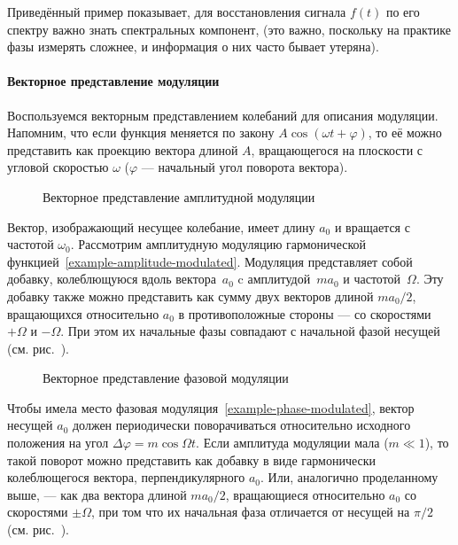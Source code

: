 Приведённый пример показывает, для восстановления сигнала $f(t)$ по его спектру важно
знать  спектральных компонент, 
(это важно, поскольку на практике фазы измерять сложнее, и информация о
них часто бывает утеряна).

\paragraph{Векторное представление модуляции}
Воспользуемся векторным представлением колебаний для описания модуляции.
Напомним, что если функция меняется по закону $A\cos (\omega t + \varphi)$,
то её можно представить как проекцию вектора
длиной $A$, вращающегося на плоскости с угловой скоростью $\omega$
($\varphi$ --- начальный угол поворота вектора).

\begin{figure}[h!]
    \centering
    \caption{Векторное представление амплитудной модуляции}
\end{figure}
Вектор, изображающий несущее колебание, имеет длину $a_0$
и вращается с частотой $\omega_0$.
Рассмотрим амплитудную модуляцию гармонической 
функцией~\eqref{example-amplitude-modulated}.
Модуляция представляет собой добавку, колеблющуюся вдоль 
вектора~$a_0$ c амплитудой~$ma_0$ и частотой~$\Omega$.
Эту добавку также можно представить как сумму двух векторов длиной
$ma_0/2$, вращающихся относительно $a_0$ в противоположные стороны ---
со скоростями $+\Omega$ и $-\Omega$. При этом их начальные фазы совпадают
с начальной фазой несущей (см. рис.~).

\begin{figure}[h!]
    \centering
    \caption{Векторное представление фазовой модуляции}
\end{figure}

Чтобы имела место фазовая модуляция~\eqref{example-phase-modulated},
вектор несущей $a_0$ должен периодически поворачиваться относительно 
исходного положения на угол $\Delta \varphi = m\cos \Omega t$. 
Если амплитуда модуляции мала ($m\ll 1$), то такой поворот можно представить 
как добавку в виде гармонически колеблющегося вектора, перпендикулярного
$a_0$. Или, аналогично проделанному выше, --- как 
два вектора длиной $ma_0/2$, вращающиеся относительно $a_0$ 
со скоростями $\pm\Omega$, при том что их начальная фаза отличается от несущей
на $\pi/2$ (см. рис.~).


